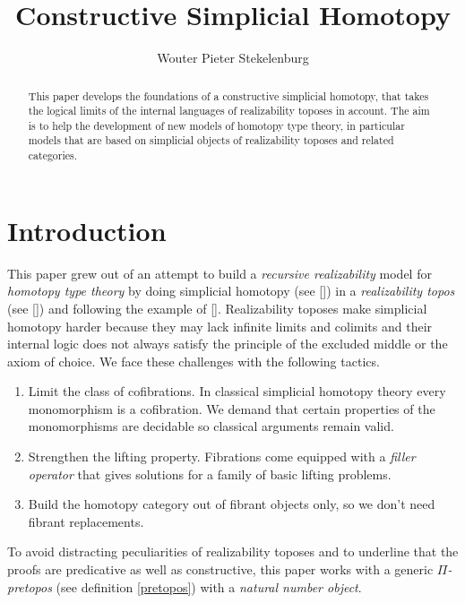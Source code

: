 \documentclass{tac}
\title{Constructive Simplicial Homotopy}
\author{Wouter Pieter Stekelenburg}
\newcommand\hide[1]{}
\newcommand\citep[1]{[\cite{#1}]}
\begin{document}
\begin{abstract} This paper develops the foundations of a constructive simplicial homotopy, that takes the logical limits of the internal languages of realizability toposes in account. The aim is to help the development of new models of homotopy type theory, in particular models that are based on simplicial objects of realizability toposes and related categories. \end{abstract}

\hide{
Three papers:
-simplicial homotopy
-complete categories [how they are preserved]
-the realizability model of HOTT [how to get a fibrant object out of a category]

Idea: reverse the order. definitions--theorem--lemmas. That way the purpose of the lemmas is set up from the start.
}

\maketitle

\section*{Introduction}
This paper grew out of an attempt to build a \emph{recursive realizability} model for \emph{homotopy type theory} by doing simplicial homotopy (see \citep{Hovey99,GJSHT}) in a \emph{realizability topos} (see \citep{MR2479466}) and following the example of \citep{KLV12}.
Realizability toposes make simplicial homotopy harder because they may lack infinite limits and colimits and their internal logic does not always satisfy the principle of the excluded middle or the axiom of choice. We face these challenges with the following tactics.
\begin{enumerate}
\item Limit the class of cofibrations. In classical simplicial homotopy theory every mono\-morphism is a cofibration. We demand that certain properties of the monomorphisms are decidable so classical arguments remain valid.
\item Strengthen the lifting property. Fibrations come equipped with a \emph{filler operator} that gives solutions for a family of basic lifting problems.
\item Build the homotopy category out of fibrant objects only, so we don't need fibrant replacements.
\end{enumerate}
To avoid distracting peculiarities of realizability toposes and to underline that the proofs are predicative as well as constructive, this paper works with a generic \emph{$\Pi$-pretopos} (see definition \ref{pretopos}) with a \emph{natural number object}.
\end{document}
